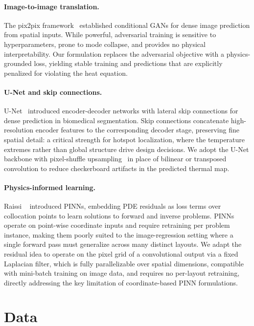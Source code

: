 \documentclass[10pt,twocolumn,letterpaper]{article}
\begin{document}
\paragraph{Image-to-image translation.}
The pix2pix framework~\cite{pix2pix} established conditional GANs for
dense image prediction from spatial inputs. While powerful, adversarial
training is sensitive to hyperparameters, prone to mode collapse, and
provides no physical interpretability. Our formulation replaces the
adversarial objective with a physics-grounded loss, yielding stable
training and predictions that are explicitly penalized for violating
the heat equation.

\paragraph{U-Net and skip connections.}
U-Net~\cite{UNet} introduced encoder-decoder networks with lateral
skip connections for dense prediction in biomedical segmentation. Skip
connections concatenate high-resolution encoder features to the
corresponding decoder stage, preserving fine spatial detail: a
critical strength for hotspot localization, where the temperature
extremes rather than global structure drive design decisions. We adopt
the U-Net backbone with pixel-shuffle upsampling~\cite{PixelShuffle}
in place of bilinear or transposed convolution to reduce checkerboard
artifacts in the predicted thermal map.

\paragraph{Physics-informed learning.}
Raissi \etal~\cite{Raissi2019} introduced PINNs, embedding PDE
residuals as loss terms over collocation points to learn solutions to
forward and inverse problems. PINNs operate on point-wise coordinate
inputs and require retraining per problem instance, making them poorly
suited to the image-regression setting where a single forward pass must
generalize across many distinct layouts. We adapt the residual idea to
operate on the pixel grid of a convolutional output via a fixed
Laplacian filter, which is fully parallelizable over spatial dimensions,
compatible with mini-batch training on image data, and requires no
per-layout retraining, directly addressing the key limitation of
coordinate-based PINN formulations.

\section{Data}
\end{document}
